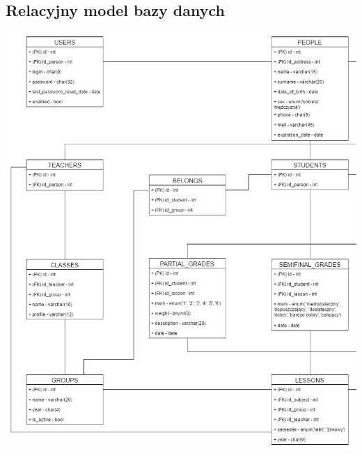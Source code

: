 \documentclass[12pt, titlepage]{article}
\begin{document}
\subsection{Relacyjny model bazy danych}
\begin{center}
\includegraphics[scale=0.5]{screeny/relational1.jpg}
\end{center}
\end{document}

